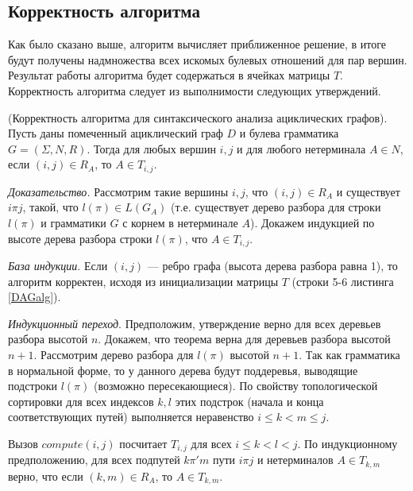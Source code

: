 \subsection {Корректность алгоритма}
Как было сказано выше, алгоритм вычисляет приближенное решение, в итоге будут получены надмножества всех искомых булевых отношений для пар вершин. Результат работы алгоритма  будет содержаться в ячейках матрицы $T$.
Корректность алгоритма следует из выполнимости следующих утверждений.
\begin{theoremrus} (Корректность алгоритма для синтаксического
анализа ациклических графов). Пусть даны помеченный
ациклический граф $D$ и булева грамматика $G = (\Sigma, N, R)$.
Тогда для любых вершин $i, j$ и для любого нетерминала $A \in N$, если
$(i, j) \in R_A$, то $A \in T_{i,j}$.
\end{theoremrus}
\textit{Доказательство.}  Рассмотрим такие вершины $i,j$, что $(i, j) \in R_A$ и существует $i \pi j$, такой, что $l(\pi) \in L(G_A)$ (т.е. существует дерево разбора для строки $l(\pi)$ и грамматики $G$ с корнем в нетерминале $A$). Докажем индукцией по высоте дерева разбора строки $l(\pi)$, что $A \in T_{i,j}$.

\textit{База индукции}. Если $(i, j)$ --- ребро графа (высота дерева разбора равна 1), то алгоритм корректен, исходя из инициализации
матрицы $T$ (строки 5-6 листинга \ref{DAGalg}).

\textit{Индукционный переход}. Предположим, утверждение верно для
всех деревьев разбора высотой $n$. Докажем, что теорема верна для
деревьев разбора высотой $n+1$. Рассмотрим дерево разбора для $l(\pi)$ высотой $n+1$. Так как
грамматика в нормальной форме, то у данного дерева будут
поддеревья, выводящие подстроки $l(\pi)$ (возможно
пересекающиеся). По свойству топологической сортировки для
всех индексов $k,l$ этих подстрок (начала и конца соответствующих
путей) выполняется неравенство $i \le k < m \le j$.

Вызов $compute(i, j)$ посчитает $T_{i,j}$ для всех $i \le k < l < j$. По индукционному предположению, для всех подпутей
$k \pi' m$ пути $i \pi j$ и нетерминалов $A \in T_{k,m}$ верно, что если $(k, m) \in R_A$, то $A \in T_{k,m}$.

